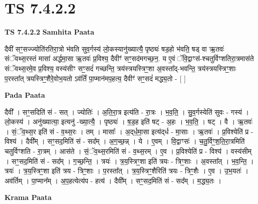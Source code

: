 \documentclass[17pt]{extarticle}
\begin{document}
\section{ TS 7.4.2.2 }

\textbf{TS 7.4.2.2 } \newline
\textbf{Samhita Paata} \newline

दैवी॑ सꣳ॒॒सज्ज्योति॑रतिरा॒त्रो भ॑वति सुव॒र्गस्य॑ लो॒कस्यानु॑ख्यात्यै॒ पृष्ठ्यः॑ षड॒हो भ॑वति॒ षड् वा ऋ॒तवः॑ संॅवथ्स॒रस्तं मासा॑ अर्द्धमा॒सा ऋ॒तवः॑ प्र॒विश्य॒ दैवीꣳ॑ सꣳ॒॒सद॑मगच्छ॒न॒. य ए॒वं ॅवि॒द्वाꣳस॑-श्चतुर्विꣳशतिरा॒त्रमास॑ते संॅवथ्स॒रमे॒व प्र॒विश्य॒ वस्य॑सीꣳ सꣳ॒॒सदं॑ गच्छन्ति॒ त्रय॑स्त्रयस्त्रिꣳ॒॒शा अ॒वस्ता᳚द्-भवन्ति॒ त्रय॑स्त्रयस्त्रिꣳ॒॒शाः प॒रस्ता᳚त् त्रयस्त्रिꣳ॒॒शैरे॒वोभ॒यतो ऽव॑र्तिं पा॒प्मान॑मप॒हत्य॒ दैवीꣳ॑ सꣳ॒॒सदं॑ मद्ध्य॒तो - [  ] \newline

\textbf{Pada Paata} \newline

दैवी᳚ । सꣳ॒॒सदिति॑ सं - सत् । ज्योतिः॑ । अ॒ति॒रा॒त्र इत्य॑ति - रा॒त्रः । भ॒व॒ति॒ । सु॒व॒र्गस्येति॑ सुवः - गस्य॑ । लो॒कस्य॑ । अनु॑ख्यात्या॒ इत्यनु॑ -ख्या॒त्यै॒ । पृष्ठ्यः॑ । ष॒ड॒ह इति॑ षट् - अ॒हः । भ॒व॒ति॒ । षट् । वै । ऋ॒तवः॑ । सं॒ॅव॒थ्स॒र इति॑ सं - व॒थ्स॒रः । तम् । मासाः᳚ । अ॒द्‌र्ध॒मा॒सा इत्य॑द्‌र्ध - मा॒साः । ऋ॒तवः॑ । प्र॒विश्येति॑ प्र - विश्य॑ । दैवी᳚म् । सꣳ॒॒सद॒मिति॑ सं - सद᳚म् । अ॒ग॒च्छ॒न्न् । ये । ए॒वम् । वि॒द्वाꣳसः॑ । च॒तु॒र्विꣳ॒॒श॒ति॒रा॒त्रमिति॑ चतुर्विꣳशति - रा॒त्रम् । आस॑ते । सं॒ॅव॒थ्स॒रमिति॑ सं - व॒थ्स॒रम् । ए॒व । प्र॒विश्येति॑ प्र - विश्य॑ । वस्य॑सीम् । सꣳ॒॒सद॒मिति॑ सं - सद᳚म् । ग॒च्छ॒न्ति॒ । त्रयः॑ । त्र॒य॒स्त्रिꣳ॒॒शा इति॑ त्रयः - त्रिꣳ॒॒शाः । अ॒वस्ता᳚त् । भ॒व॒न्ति॒ । त्रयः॑ । त्र॒य॒स्त्रिꣳ॒॒शा इति॑ त्रय - त्रिꣳ॒॒शाः । प॒रस्ता᳚त् । त्र॒य॒स्त्रिꣳ॒॒शैरिति॑ त्रयः - त्रिꣳ॒॒शैः । ए॒व । उ॒भ॒यतः॑ । अव॑र्तिम् । पा॒प्मान᳚म् । अ॒प॒हत्येत्य॑प - हत्य॑ । दैवी᳚म् । सꣳ॒॒सद॒मिति॑ सं - सद᳚म् । म॒द्ध्य॒तः ।  \newline


\textbf{Krama Paata} \newline
\end{document}
